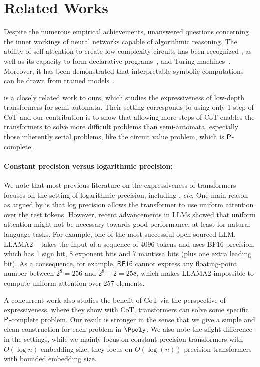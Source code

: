  
\section{Related Works}\label{sec:related_works}
 
Despite the numerous empirical achievements, unanswered questions concerning the inner workings of neural networks capable of algorithmic reasoning. The ability of self-attention to create low-complexity circuits has been recognized \citep{edelman2022inductive,hahn2020theoretical,merrill2021power}, as well as its capacity to form declarative programs~\citep{weiss2021thinking}, and Turing machines~\citep{dehghani2018universal,giannou2023looped,perez2021attention}. Moreover, it has been demonstrated that interpretable symbolic computations can be drawn from trained models~\citep{clark2019does,tenney2019bert,vig2019visualizing,wang2022interpretability}.

\citet{liu2022transformers} is a closely related work to ours, which studies the expressiveness of low-depth transformers for semi-automata. Their setting corresponds to using only 1 step of CoT and our contribution is to show that allowing more steps of CoT enables the transformers to solve more difficult problems than semi-automata, especially those inherently serial problems, like the circuit value problem, which is $\P$-complete.

\paragraph{Constant precision versus logarithmic precision:} We note that most previous literature on the expressiveness of transformers focuses on the setting of logarithmic precision, including \citep{merrill2023parallelism,merrill2022saturated,merrill2021power,liu2022transformers}, \emph{etc}. One main reason as argued by \citet{merrill2023logic} is that log precision allows the transformer to use uniform attention over the rest tokens. However, recent advancements in LLMs showed that uniform attention might not be necessary towards good performance, at least for natural language tasks. For example, one of the most successful open-sourced LLM, LLAMA2 ~\citep{touvron2023llama} takes the input of a sequence of $4096$ tokens and uses \textsf{BF16} precision, which has 1 sign bit, 8 exponent bits and 7 mantissa bits (plus one extra leading bit). As a consequence, for example, $\mathsf{BF16}$ cannot express any floating-point number between $2^8=256 $ and $2^8+2 = 258$, which makes LLAMA2 impossible to compute uniform attention over $257$ elements.

A concurrent work \citet{feng2023towards} also studies the benefit of CoT via the perspective of expressiveness, where they show with CoT, transformers can solve some specific $\P$-complete problem. Our result is stronger in the sense that we give a simple and clean construction for each problem in $\Ppoly$. We also note the slight difference in the settings, while we mainly focus on constant-precision transformers with $O(\log n)$ embedding size, they focus on $O(\log (n))$ precision transformers with bounded embedding size.
